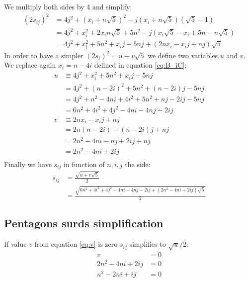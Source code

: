 \documentclass[11pt]{article}
\begin{document}
We multiply both sides by 4 and simplify:   
\begin{align}
(2s_{ij})^2 &= 4j^2 + (x_i + n\sqrt{5})^2 - j(x_i + n\sqrt{5})(\sqrt{5} - 1) \\
 &= 4j^2 + x_i^2 + 2x_in\sqrt{5} + 5n^2 - j(x_i\sqrt{5} - x_i + 5n - n\sqrt{5})\\
 &= 4j^2 + x_i^2 + 5n^2 + x_ij - 5nj + (2nx_i - x_ij + nj)\sqrt{5}
\end{align}
In order to have a simpler $(2s_i)^2 = u+v\sqrt{5}$ we define two variables $u$ and $v$.
We replace again $x_i = n - 4i$ defined in equation \ref{eq:B_iC}:
\begin{align}
u &\equiv 4j^2 + x_i^2 + 5n^2 + x_ij - 5nj \nonumber\\
 &= 4j^2 + (n-2i)^2 + 5n^2 + (n-2i)j - 5nj \nonumber\\
 &= 4j^2 + n^2 - 4ni + 4i^2 + 5n^2 + nj - 2ij - 5nj \nonumber\\
 &= 6n^2 + 4i^2 + 4j^2 - 4ni - 4nj - 2ij  \label{eq:u}\\
v &\equiv 2nx_i - x_ij + nj \nonumber\\
 &= 2n(n-2i) - (n-2i)j + nj \nonumber\\
 &= 2n^2 - 4ni - nj + 2ij + nj \nonumber\\
 &= 2n^2 - 4ni + 2ij \label{eq:v}\\
\end{align}
Finally we have $s_{ij}$ in function of $n,i,j$ the side:
\begin{align}
s_{ij} &= \frac{\sqrt{u+v\sqrt{5}}}{2} \nonumber\\
 &= \frac{\sqrt{6n^2 + 4i^2 + 4j^2 - 4ni - 4nj - 2ij + (2n^2 - 4ni + 2ij)\sqrt{5}}}{2}
\end{align}

\subsection{Pentagons surds simplification}

If value $v$ from equation \ref{eq:v} is zero $s_{ij}$ simplifies to $\sqrt{u}/2$:
\begin{align}
v &= 0 \nonumber\\
2n^2 - 4ni + 2ij &= 0 \nonumber\\
n^2 - 2ni + ij &= 0 \nonumber\\
\end{align}
\end{document}
